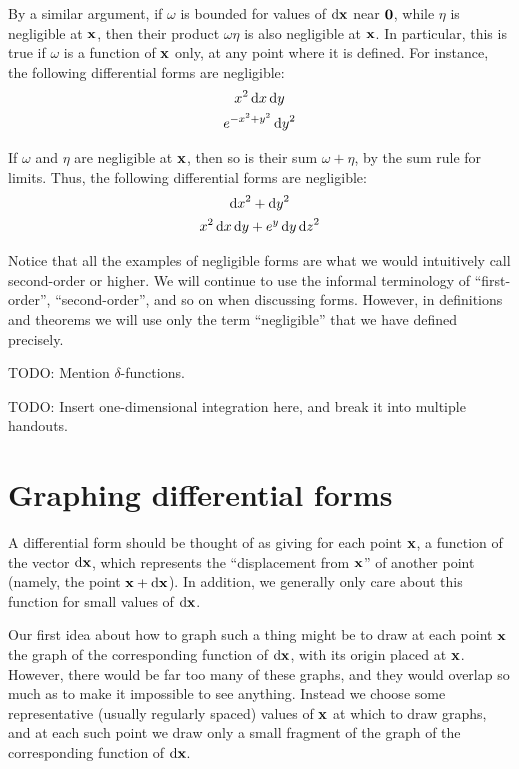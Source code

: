 \documentclass[12pt]{amsart}
\begin{document}
\begin{eg}
  By a similar argument, if $\omega$ is bounded for values of ${\mathrm{d} \mathbf{x}}$ near $\mathbf{0}$, while $\eta$ is negligible at $\mathbf{x}$, then their product $\omega\eta$ is also negligible at $\mathbf{x}$.
  In particular, this is true if $\omega$ is a function of $\mathbf{x}$ only, at any point where it is defined.
  For instance, the following differential forms are negligible:
  \begin{gather*}
    x^2\,{\mathrm{d} x}\,{\mathrm{d} y}\\
    e^{-x^2+y^2} \,{\mathrm{d} y}^2
  \end{gather*}
\end{eg}

\begin{eg}
  If $\omega$ and $\eta$ are negligible at $\mathbf{x}$, then so is their sum $\omega+\eta$, by the sum rule for limits.
  Thus, the following differential forms are negligible:
  \begin{gather*}
    {\ensuremath{\mathrm{d} x}}^2 + {\mathrm{d} y}^2\\
    x^2 \,{\mathrm{d} x}\,{\mathrm{d} y} + e^{y}\,{\mathrm{d} y}\,{\mathrm{d} z}^2
  \end{gather*}
\end{eg}

Notice that all the examples of negligible forms are what we would intuitively call second-order or higher.
We will continue to use the informal terminology of ``first-order'', ``second-order'', and so on when discussing forms.
However, in definitions and theorems we will use only the term ``negligible'' that we have defined precisely.

TODO: Mention $\delta$-functions.

TODO: Insert one-dimensional integration here, and break it into multiple handouts.

\section{Graphing differential forms}
\label{sec:graphing-differential-forms}

A differential form should be thought of as giving for each point $\mathbf{x}$, a function of the vector ${\mathrm{d} \mathbf{x}}$, which represents the ``displacement from $\mathbf{x}$'' of another point (namely, the point $\mathbf{x}+{\mathrm{d} \mathbf{x}}$).
In addition, we generally only care about this function for small values of ${\mathrm{d} \mathbf{x}}$.

Our first idea about how to graph such a thing might be to draw at each point $\mathbf{x}$ the graph of the corresponding function of ${\mathrm{d} \mathbf{x}}$, with its origin placed at $\mathbf{x}$.
However, there would be far too many of these graphs, and they would overlap so much as to make it impossible to see anything.
Instead we choose some representative (usually regularly spaced) values of $\mathbf{x}$ at which to draw graphs, and at each such point we draw only a small fragment of the graph of the corresponding function of ${\mathrm{d} \mathbf{x}}$.
\end{document}
